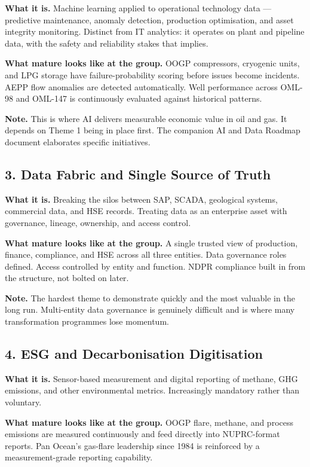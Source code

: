 \documentclass[10pt]{article}
\newcommand{\spacer}{\vspace{10pt}}
\begin{document}
\textbf{What it is.} Machine learning applied to operational technology data
--- predictive maintenance, anomaly detection, production optimisation, and
asset integrity monitoring. Distinct from IT analytics: it operates on plant
and pipeline data, with the safety and reliability stakes that implies.

\textbf{What mature looks like at the group.} OOGP compressors, cryogenic
units, and LPG storage have failure-probability scoring before issues become
incidents. AEPP flow anomalies are detected automatically. Well performance
across OML-98 and OML-147 is continuously evaluated against historical
patterns.

\textbf{Note.} This is where AI delivers measurable economic value in oil
and gas. It depends on Theme 1 being in place first. The companion AI and
Data Roadmap document elaborates specific initiatives.

\spacer

\subsection*{3. Data Fabric and Single Source of Truth}

\textbf{What it is.} Breaking the silos between SAP, SCADA, geological systems,
commercial data, and HSE records. Treating data as an enterprise asset with
governance, lineage, ownership, and access control.

\textbf{What mature looks like at the group.} A single trusted view of
production, finance, compliance, and HSE across all three entities. Data
governance roles defined. Access controlled by entity and function. NDPR
compliance built in from the structure, not bolted on later.

\textbf{Note.} The hardest theme to demonstrate quickly and the most valuable
in the long run. Multi-entity data governance is genuinely difficult and is
where many transformation programmes lose momentum.

\spacer

\subsection*{4. ESG and Decarbonisation Digitisation}

\textbf{What it is.} Sensor-based measurement and digital reporting of methane,
GHG emissions, and other environmental metrics. Increasingly mandatory rather
than voluntary.

\textbf{What mature looks like at the group.} OOGP flare, methane, and process
emissions are measured continuously and feed directly into NUPRC-format
reports. Pan Ocean's gas-flare leadership since 1984 is reinforced by a
measurement-grade reporting capability.
\end{document}
